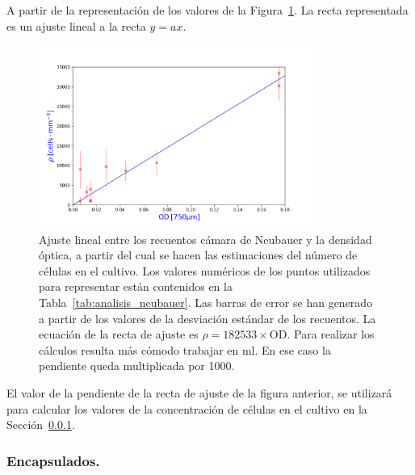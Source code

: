 A partir de la representación de los valores de la Figura~\ref{fig:recuentos_camara_neubauer}. La recta representada es un ajuste lineal a la recta $y=ax$.

\begin{figure}[H]
    \begin{center}
        \includegraphics[width=0.8\textwidth]{4_resultados/ajuste_rho_cultivo.png}
    \caption{\small Ajuste lineal entre los recuentos cámara de Neubauer y la densidad óptica, a partir del cual se hacen las estimaciones del número de células en el cultivo. Los valores numéricos de los puntos utilizados para representar están contenidos en la Tabla~\ref{tab:analisis_neubauer}. Las barras de error se han generado a partir de los valores de la desviación estándar de los recuentos. La ecuación de la recta de ajuste es $\rho=182533\times \mathrm{OD}$. Para realizar los cálculos resulta más cómodo trabajar en ml. En ese caso la pendiente queda multiplicada por 1000.}
    \label{fig:recuentos_camara_neubauer}
    
    \end{center}
\end{figure}

El valor de la pendiente de la recta de ajuste de la figura anterior, se utilizará para calcular los valores de la concentración de células en el cultivo en la Sección~\ref{sec:resultados:encapsulados}.

\subsubsection{Encapsulados.}\label{sec:resultados:encapsulados}

